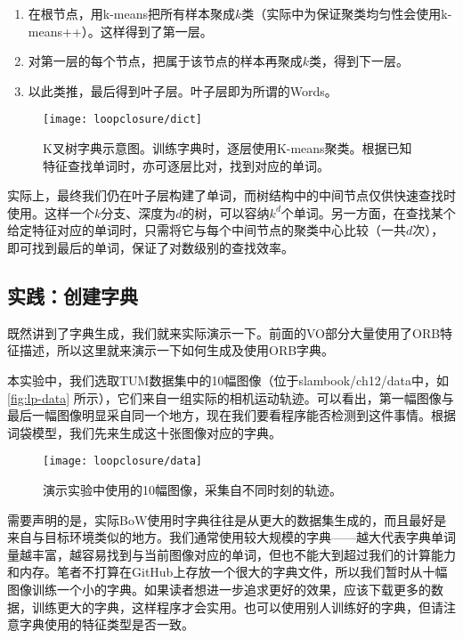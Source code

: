 \begin{mdframed}
\begin{enumerate}
	\item 在根节点，用k-means把所有样本聚成$k$类（实际中为保证聚类均匀性会使用k-means++）。这样得到了第一层。
	\item 对第一层的每个节点，把属于该节点的样本再聚成$k$类，得到下一层。
	\item 以此类推，最后得到叶子层。叶子层即为所谓的Words。
\end{enumerate}
\end{mdframed}

\begin{figure}[!ht]
	\centering
	\texttt{[image: loopclosure/dict]}
	\caption{K叉树字典示意图。训练字典时，逐层使用K-means聚类。根据已知特征查找单词时，亦可逐层比对，找到对应的单词。}
	\label{fig:lp-dict}
\end{figure}

实际上，最终我们仍在叶子层构建了单词，而树结构中的中间节点仅供快速查找时使用。这样一个$k$分支、深度为$d$的树，可以容纳$k^d$个单词。另一方面，在查找某个给定特征对应的单词时，只需将它与每个中间节点的聚类中心比较（一共$d$次），即可找到最后的单词，保证了对数级别的查找效率。

\subsection{实践：创建字典}
既然讲到了字典生成，我们就来实际演示一下。前面的VO部分大量使用了ORB特征描述，所以这里就来演示一下如何生成及使用ORB字典。

本实验中，我们选取TUM数据集中的10幅图像（位于slambook/ch12/data中，如\autoref{fig:lp-data} 所示），它们来自一组实际的相机运动轨迹。可以看出，第一幅图像与最后一幅图像明显采自同一个地方，现在我们要看程序能否检测到这件事情。根据词袋模型，我们先来生成这十张图像对应的字典。

\begin{figure}[!htp]
	\centering
	\texttt{[image: loopclosure/data]}
	\caption{演示实验中使用的10幅图像，采集自不同时刻的轨迹。}
	\label{fig:lp-data}
\end{figure}

需要声明的是，实际BoW使用时字典往往是从更大的数据集生成的，而且最好是来自与目标环境类似的地方。我们通常使用较大规模的字典——越大代表字典单词量越丰富，越容易找到与当前图像对应的单词，但也不能大到超过我们的计算能力和内存。笔者不打算在GitHub上存放一个很大的字典文件，所以我们暂时从十幅图像训练一个小的字典。如果读者想进一步追求更好的效果，应该下载更多的数据，训练更大的字典，这样程序才会实用。也可以使用别人训练好的字典，但请注意字典使用的特征类型是否一致。

